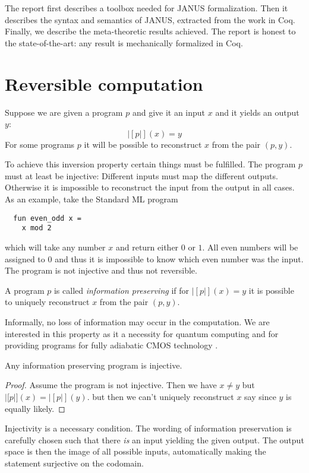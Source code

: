 The report first describes a toolbox needed for JANUS
formalization. Then it describes the syntax and semantics of JANUS,
extracted from the work in Coq. Finally, we describe the
meta-theoretic results achieved. The report is honest to the
state-of-the-art: any result is mechanically formalized in Coq.

\section{Reversible computation}
\label{sec:revers-comp}

Suppose we are given a program $p$ and give it an input $x$ and it
yields an output $y$:
\begin{equation*}
  |[p|](x) = y
\end{equation*}
For some programs $p$ it will be possible to reconstruct $x$ from the
pair $(p, y)$.

To achieve this inversion property certain things must be
fulfilled. The program $p$ must at least be injective: Different
inputs must map the different outputs. Otherwise it is impossible to
reconstruct the input from the output in all cases. As an example,
take the Standard ML program
\begin{verbatim}
  fun even_odd x =
    x mod 2
\end{verbatim}
which will take any number $x$ and return either $0$ or $1$. All even
numbers will be assigned to $0$ and thus it is impossible to know
which even number was the input. The program is not injective and thus
not reversible.

\begin{defn}
  A program $p$ is called \emph{information preserving} if for
  $|[p|](x) = y$ it is possible to uniquely reconstruct $x$ from the
  pair $(p, y)$.
\end{defn}
Informally, no loss of information may occur in the computation. We
are interested in this property as it a necessity for quantum
computing  and for providing programs for fully
adiabatic CMOS technology .

\begin{thm}
  Any information preserving program is injective.
\end{thm}
\begin{proof}
  Assume the program is not injective. Then we have $x \neq y$ but
  $|[p|](x) = |[p|](y)$. but then we can't uniquely reconstruct $x$
  say since $y$ is equally likely.
\end{proof}
Injectivity is a necessary condition. The wording of information
preservation is carefully chosen such that there \emph{is} an input
yielding the given output. The output space is then the image of all
possible inputs, automatically making the statement surjective on the
codomain.

